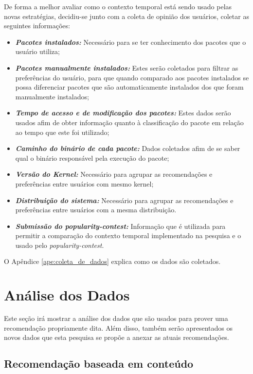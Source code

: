 De forma a melhor avaliar como o contexto temporal está sendo usado pelas novas
estratégias, decidiu-se junto com a coleta de opinião dos usuários, coletar
as seguintes informações:

\begin{itemize}
    \item \textit{\textbf{Pacotes instalados:}} Necessário para se ter conhecimento dos pacotes que o usuário utiliza;
    \item \textit{\textbf{Pacotes manualmente instalados:}} Estes serão coletados para filtrar as preferências do usuário, para que quando comparado aos pacotes instalados se possa diferenciar pacotes que são automaticamente instalados dos que foram manualmente instalados;
    \item \textit{\textbf{Tempo de acesso e de modificação dos pacotes:}} Estes dados serão usados afim de obter
        informação quanto à classificação do pacote em relação ao tempo que este foi utilizado;
    \item \textit{\textbf{Caminho do binário de cada pacote:}} Dados coletados afim de se saber qual o binário responsável pela execução do pacote;
    \item \textit{\textbf{Versão do Kernel:}} Necessário para agrupar as recomendações e preferências entre usuários com mesmo kernel;
    \item \textit{\textbf{Distribuição do sistema:}} Necessário para agrupar as recomendações e preferências entre usuários com a mesma distribuição.
    \item \textit{\textbf{Submissão do popularity-contest:}} Informação que é
        utilizada para permitir a comparação do contexto temporal implementado
        na pesquisa e o usado pelo \textit{popularity-contest}.
\end{itemize}

O Apêndice \ref{ape:coleta_de_dados} explica como os dados são coletados.

\section{Análise dos Dados}

Este seção irá mostrar a análise dos dados que são usados para prover uma
recomendação propriamente dita. Além disso, também serão apresentados os novos dados
que esta pesquisa se propõe a anexar as atuais recomendações.

\subsection{Recomendação baseada em conteúdo}

